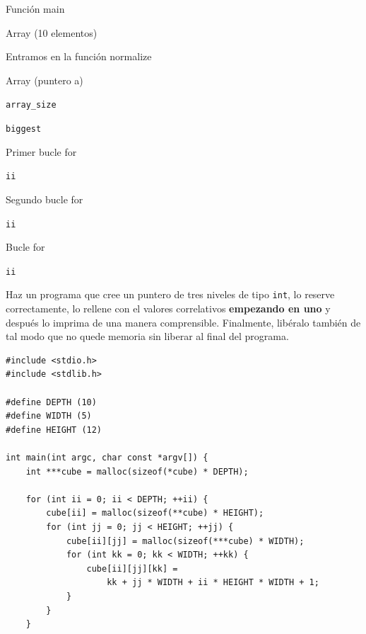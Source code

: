 \documentclass[a4paper]{article}
\begin{document}
\begin{exercises}
\begin{stack}
    \item Función main
    \begin{stack}
        \item Array (10 elementos)
        \item Entramos en la función normalize
        \begin{stack}
            \item Array (puntero a)
            \item \verb!array_size!
            \item \verb!biggest!
            \item Primer bucle for
            \begin{stack}
                \item \verb!ii!
            \end{stack}
            \item Segundo bucle for
            \begin{stack}
                \item \verb!ii!
            \end{stack}
        \end{stack}
        \item Bucle for
        \begin{stack}
            \item \verb!ii!
        \end{stack}
    \end{stack}
\end{stack}

\item Haz un programa que cree un puntero de tres niveles de tipo \verb!int!,
lo reserve correctamente, lo rellene con el valores correlativos
\textbf{empezando en uno} y después lo imprima de una manera comprensible.
Finalmente, libéralo también de tal modo que no quede memoria sin liberar al
final del programa.

\noindent
\begin{minipage}[H]{\linewidth}
\mbox{}
\begin{lstlisting}[style=C,label=lst:solution12, caption={Solución al ejercicio 12}]
#include <stdio.h>
#include <stdlib.h>

#define DEPTH (10)
#define WIDTH (5)
#define HEIGHT (12)

int main(int argc, char const *argv[]) {
    int ***cube = malloc(sizeof(*cube) * DEPTH);

    for (int ii = 0; ii < DEPTH; ++ii) {
        cube[ii] = malloc(sizeof(**cube) * HEIGHT);
        for (int jj = 0; jj < HEIGHT; ++jj) {
            cube[ii][jj] = malloc(sizeof(***cube) * WIDTH);
            for (int kk = 0; kk < WIDTH; ++kk) {
                cube[ii][jj][kk] =
                    kk + jj * WIDTH + ii * HEIGHT * WIDTH + 1;
            }
        }
    }


\end{lstlisting}
\end{minipage}
\end{exercises}
\end{document}

